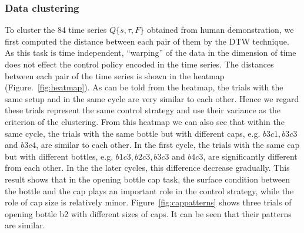 \subsubsection{Data clustering}
To cluster the 84 time series $Q\{s,\tau,F\}$ obtained from human demonstration, we first computed the distance between each pair of them by the DTW technique. As this task is time independent, ``warping'' of the data in the dimension of time does not effect the control policy encoded in the time series. The distances between each pair of the time series is shown in the heatmap (Figure.~\ref{fig:heatmap}). As can be told from the heatmap, the trials with the same setup and in the same cycle are very similar to each other. Hence we regard these trials represent the same control strategy and use their variance as the criterion of the clustering. From this heatmap we can also see that within the same cycle, the trials with the same bottle but with different caps, e.g. $b3c1, b3c3$ and $b3c4$, are similar to each other. In the first cycle, the trials with the same cap but with different bottles, e.g. $b1c3, b2c3, b3c3$ and $b4c3$, are significantly different from each other. In the the later cycles, this difference decrease gradually. This result shows that in the opening bottle cap task, the surface condition between the bottle and the cap plays an important role in the control strategy, while the role of cap size is relatively minor. Figure~\ref{fig:cappatterns} shows three trials of opening bottle b2 with different sizes of caps. It can be seen that their patterns are similar.

